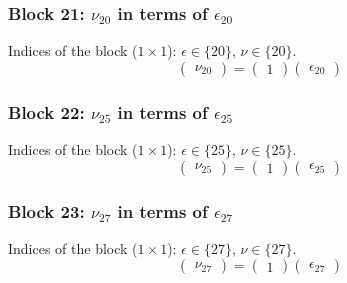 \subsubsection{Block 21: $\nu_{20}$ in terms of $\epsilon_{20}$}
Indices of the block ($1\times 1$): $\epsilon \in \{20\}$, $\nu \in \{20\}$.
\[
\begin{pmatrix}
\nu_{20}
\end{pmatrix}
=
\begin{pmatrix}
1
\end{pmatrix}
\begin{pmatrix}
\epsilon_{20}
\end{pmatrix}
\]

\subsubsection{Block 22: $\nu_{25}$ in terms of $\epsilon_{25}$}
Indices of the block ($1\times 1$): $\epsilon \in \{25\}$, $\nu \in \{25\}$.
\[
\begin{pmatrix}
\nu_{25}
\end{pmatrix}
=
\begin{pmatrix}
1
\end{pmatrix}
\begin{pmatrix}
\epsilon_{25}
\end{pmatrix}
\]

\subsubsection{Block 23: $\nu_{27}$ in terms of $\epsilon_{27}$}
Indices of the block ($1\times 1$): $\epsilon \in \{27\}$, $\nu \in \{27\}$.
\[
\begin{pmatrix}
\nu_{27}
\end{pmatrix}
=
\begin{pmatrix}
1
\end{pmatrix}
\begin{pmatrix}
\epsilon_{27}
\end{pmatrix}
\]

